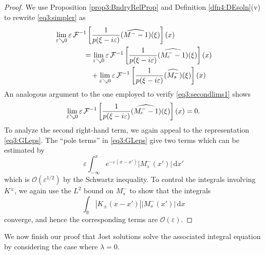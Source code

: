 \documentclass[../dissertation.tex]{subfiles}
\begin{document}
\begin{proof}
	We use Proposition 
	\ref{prop3:BndryRelProp} and Definition \ref{dfn4:DEsoln}(v) to rewrite
	\eqref{eq3:simpler} as 
	\begin{align}
		&\lim_{\varepsilon \searrow 0} 
				\varepsilon \, \mathcal F^{-1}
					\left[ 
						\frac{1}{p(\xi-i\varepsilon)} (\widehat{M^--1})(\xi) 
					\right](x)
					\\
		&\qquad\qquad= \lim_{\varepsilon \searrow 0} 
				\varepsilon \, \mathcal F^{-1}
					\left[ 
						\frac{1}{p(\xi-i\varepsilon)} (\widehat{M_c^--1})(\xi) 
					\right](x) 
				\nonumber \\
		&\qquad\qquad\quad+ \lim_{\varepsilon \searrow 0} 
				\varepsilon \, \mathcal F^{-1}
					\left[ 
						\frac{1}{p(\xi-i\varepsilon)} (\widehat{M_s^-})(\xi) 
					\right](x)
				\nonumber
	\end{align}
	An analogous argument to the one employed to verify \eqref{eq3:secondlims1} 
	shows
	\[
		\lim_{\varepsilon \searrow 0} 
				\varepsilon \, \mathcal F^{-1}
					\left[ 
						\frac{1}{p(\xi-i\varepsilon)} (\widehat{M_c^--1})(\xi) 
					\right](x) 
			= 0.
	\]
	To analyze the second right-hand term, we again appeal to the representation 
	\eqref{eq3:GLeps}. The ``pole terms'' in \eqref{eq3:GLeps} give
	two terms which can be estimated by
	\[
		\varepsilon \int_{-\infty}^x e^{-\varepsilon(x-x')} |M_s^-(x')| \, \mathrm{d}x'
	\]
	which is $\mathcal O\left(\varepsilon^{1/2}\right)$ by the Schwartz inequality. 
	To control the integrals involving $K^\pm$, we again use the $L^2$ 
	bound on $M_s^-$ to show that the integrals 
	\[
		\int_{\mathbb R} |K_\pm(x-x')| |M_s^-(x')| \, \mathrm{d}x
	\]
	converge, and hence the corresponding terms are 
	$\mathcal O\left(\varepsilon\right)$.
\end{proof}

We now finish our proof that Jost solutions solve the associated integral 
equation by considering the case where $\lambda = 0$.
\end{document}
